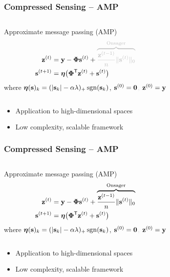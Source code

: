 
\begin{frame}
\frametitle{Compressed Sensing -- AMP}
\hfill
\scalebox{0.5}{}
\vspace{-1cm}

\begin{columns}
\begin{block}{Approximate message passing (AMP)}
\blockmathspace
\begin{align*}
\zv^{(t)} &= \yv - \boldsymbol{\Phi} \sv^{(t)} + \textcolor{lightgray}{\overbrace{\frac{\zv^{(t-1)}}{n} \| \sv^{(t)} \|_0}^{\text{Onsager}}} \\
\sv^{(t+1)} &= \etav \big( \boldsymbol{\Phi}^{\transpose} \zv^{(t)} + \sv^{(t)} \big)
\end{align*}
where $\boldsymbol{\eta} (\mathbf{s})_k = (|\mathbf{s}_k| - \alpha \lambda)_+ \operatorname{sgn}(\mathbf{s}_k)$, \textcolor{lightgray}{$\mathbf{s}^{(0)} = \mathbf{0}$, $\mathbf{z}^{(0)} = \mathbf{y}$}
\end{block}
\end{columns}
\vfill
\begin{itemize}
\item Application to high-dimensional spaces
\item Low complexity, scalable framework
\end{itemize}
\end{frame}



\begin{frame}
\frametitle{Compressed Sensing -- AMP}
\hfill
\scalebox{0.5}{}
\vspace{-1cm}

\begin{columns}
\begin{block}{Approximate message passing (AMP)}
\blockmathspace
\begin{align*}
\mathbf{z}^{(t)} &= \mathbf{y} - \boldsymbol{\Phi} \mathbf{s}^{(t)} + \overbrace{\frac{\mathbf{z}^{(t-1)}}{n} \| \mathbf{s}^{(t)} \|_0}^{\text{Onsager}} \\
\mathbf{s}^{(t+1)} &= \boldsymbol{\eta} \big( \boldsymbol{\Phi}^{\mathsf{T}} \mathbf{z}^{(t)} + \mathbf{s}^{(t)} \big)
\end{align*}
where $\boldsymbol{\eta} (\mathbf{s})_k = (|\mathbf{s}_k| - \alpha \lambda)_+ \operatorname{sgn}(\mathbf{s}_k)$, \textcolor{lightgray}{$\mathbf{s}^{(0)} = \mathbf{0}$, $\mathbf{z}^{(0)} = \mathbf{y}$}
\end{block}
\end{columns}
\vfill
\begin{itemize}
\item Application to high-dimensional spaces
\item Low complexity, scalable framework
\end{itemize}
\end{frame}

